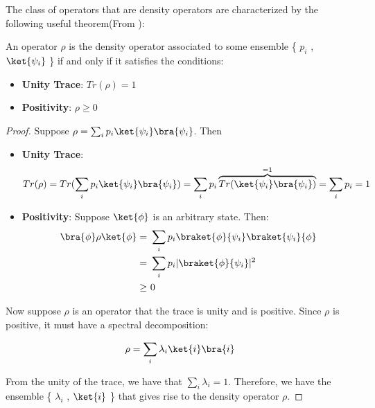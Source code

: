 The class of operators that are density operators are characterized by the following useful theorem(From \citep{nielsen_chuang_2010}):

\begin{theorem}
An operator $\rho$ is the density operator associated to some ensemble \{ $p_i$ , $\ket{\psi_i}$ \} if and only if it satisfies the
conditions:

\begin{itemize}
    \item \textbf{Unity Trace}: $Tr(\rho) = 1$
    \item \textbf{Positivity}: $\rho \geq 0$
\end{itemize}
\end{theorem}

\begin{proof}
Suppose $\rho = \sum_i p_i \ket{\psi_i}\bra{\psi_i}$. Then
\begin{itemize}
    \item \textbf{Unity Trace}: 
    \begin{equation}
        Tr(\rho) = Tr(\sum_i p_i \ket{\psi_i}\bra{\psi_i}) = \sum_i p_i \overbrace{Tr(\ket{\psi_i}\bra{\psi_i})}^{=1} = \sum_i p_i = 1
    \end{equation}
    
    \item \textbf{Positivity}: Suppose $\ket{\phi}$ is an arbitrary state. Then:
    \begin{equation}
        \begin{split}
            \bra{\phi} \rho \ket{\phi} = & \ \sum_i p_i \braket{\phi}{\psi_i}\braket{\psi_i}{\phi} \\
            = & \ \sum_i p_i |\braket{\phi}{\psi_i}|^2 \\
            \geq &  \ 0
        \end{split}
    \end{equation}
\end{itemize}

Now suppose $\rho$ is an operator that the trace is unity and is positive. Since $\rho$ is positive, it must have a spectral decomposition:

\begin{equation}
    \rho = \sum_i \lambda_i \ket{i} \bra{i}
\end{equation}

From the unity of the trace, we have that $\sum_i \lambda_i = 1$. Therefore, we have the ensemble \{ $\lambda_i$ , $\ket{i}$ \} that gives rise to the density operator $\rho$.
\end{proof}
 
